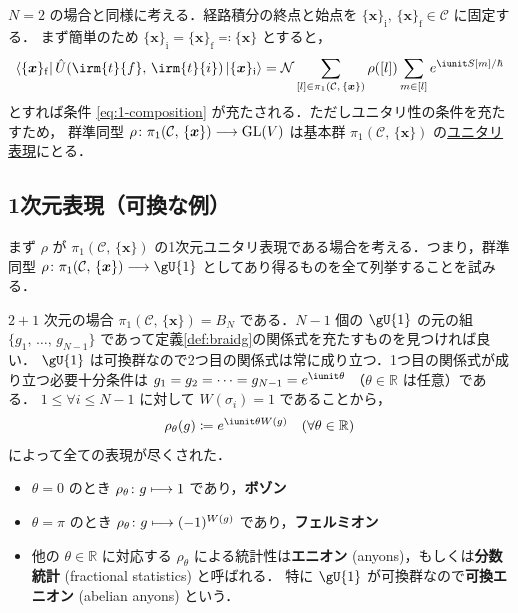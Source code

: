 \documentclass[TQFT_main]{subfiles}
\begin{document}
$N = 2$ の場合と同様に考える．経路積分の終点と始点を $\{\bm{x}\}_{\mathrm{i}},\, \{\bm{x}\}_{\mathrm{f}} \in \mathcal{C}$ に固定する．
まず簡単のため $\{\bm{x}\}_{\mathrm{i}} = \{\bm{x}\}_{\mathrm{f}} \eqqcolon \{\bm{x}\}$ とすると，
\begin{align}
    \bra{\{\bm{x}\}_{\mathrm{f}}} \hat{U}(\irm{t}{f},\, \irm{t}{i}) \ket{\{\bm{x}\}_{\mathrm{i}}} =\mathcal{N} \sum_{[l] \in \pi_1(\mathcal{C},\, \{\bm{x}\})} \rho([l]) \sum_{m \in [l]} e^{\iunit S[m]/\hbar}
\end{align}
とすれば条件 \eqref{eq:1-composition} が充たされる．ただしユニタリ性の条件を充たすため，
群準同型
$\rho \colon \pi_1(\mathcal{C},\, \{\bm{x}\}) \longrightarrow \mathrm{GL}(V)$ 
は基本群 $\pi_1(\mathcal{C},\, \{\bm{x}\})$ の\underline{ユニタリ表現}にとる．

\subsection{1次元表現（可換な例）}

まず $\rho$ が $\pi_1(\mathcal{C},\, \{\bm{x}\})$ の1次元ユニタリ表現である場合を考える．つまり，群準同型 $\rho \colon \pi_1(\mathcal{C},\, \{\bm{x}\}) \lto \gU{1}$ としてあり得るものを全て列挙することを試みる．

\begin{myexample}[label=ex:1-1abelian]{$2+1$ 次元の場合}
    $\pi_1(\mathcal{C},\, \{\bm{x}\}) = B_N$ である．$N-1$ 個の $\gU{1}$ の元の組 $\{g_1,\, \dots ,\, g_{N-1}\}$ であって定義\ref{def:braidg}の関係式を充たすものを見つければ良い．
    $\gU{1}$ は可換群なので2つ目の関係式は常に成り立つ．1つ目の関係式が成り立つ必要十分条件は $g_1 = g_2 = \cdots  = g_{N-1} = e^{\iunit \theta}$ （$\theta \in \mathbb{R}$ は任意）である．
    $1 \le \forall i \le N-1$ に対して $W(\sigma_i) = 1$ であることから，
    \begin{align}
        \rho_\theta (g) \coloneqq e^{\iunit \theta W(g)}\quad (\forall \theta \in \mathbb{R})
    \end{align}
    によって全ての表現が尽くされた．
    \begin{itemize}
        \item $\theta = 0$ のとき $\rho_\theta \colon g \longmapsto 1$ であり，\textbf{ボゾン}
        \item $\theta = \pi$ のとき $\rho_\theta \colon g \longmapsto (-1)^{W(g)}$ であり，\textbf{フェルミオン}
        \item 他の $\theta \in \mathbb{R}$ に対応する $\rho_\theta$ による統計性は\textbf{エニオン} (anyons)，もしくは\textbf{分数統計} (fractional statistics) と呼ばれる．
        特に $\gU{1}$ が可換群なので\textbf{可換エニオン} (abelian anyons) という．
    \end{itemize}
\end{myexample}
\end{document}
